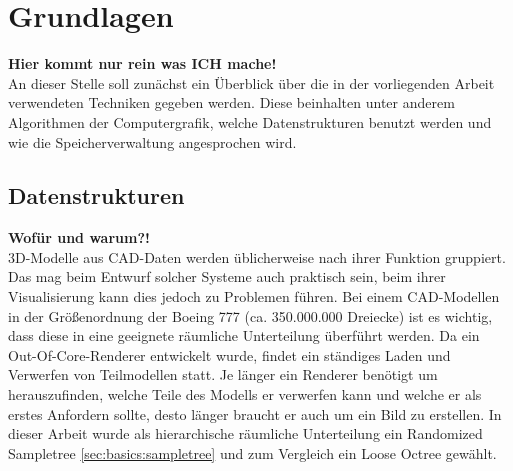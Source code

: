 \chapter{Grundlagen}
\label{chap:basics}

\textbf{Hier kommt nur rein was ICH mache!}\\
An dieser Stelle soll zunächst ein Überblick über die in der vorliegenden Arbeit verwendeten Techniken gegeben werden. Diese beinhalten unter anderem Algorithmen der Computergrafik, welche Datenstrukturen benutzt werden und wie die Speicherverwaltung angesprochen wird.

\section{Datenstrukturen}
\label{sec:basics:datenstrukturen}
\textbf{Wofür und warum?!}\\
3D-Modelle aus CAD-Daten werden üblicherweise nach ihrer Funktion gruppiert. Das mag beim Entwurf solcher Systeme auch praktisch sein, beim ihrer Visualisierung kann dies jedoch zu Problemen führen. Bei einem CAD-Modellen in der Größenordnung der Boeing 777 (ca. 350.000.000 Dreiecke) ist es wichtig, dass diese in eine geeignete räumliche Unterteilung überführt werden. Da ein Out-Of-Core-Renderer entwickelt wurde, findet ein ständiges Laden und Verwerfen von Teilmodellen statt. Je länger ein Renderer benötigt um herauszufinden, welche Teile des Modells er verwerfen kann und welche er als erstes Anfordern sollte, desto länger braucht er auch um ein Bild zu erstellen. In dieser Arbeit wurde als hierarchische räumliche Unterteilung ein Randomized Sampletree \ref{sec:basics:sampletree} und zum Vergleich ein Loose Octree gewählt.


